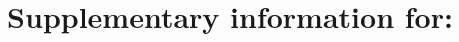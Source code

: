 \documentclass[11pt]{article}
\title{Supplementary information for: \mstitle}
\begin{document}
\onehalfspacing

\maketitle



\clearpage



\clearpage



\clearpage

\printbibliography
\end{document}

